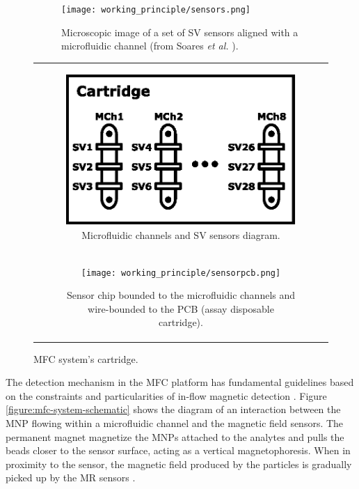 \begin{figure}[!ht]
    \centering
    \begin{subfigure}[c]{.48\textwidth}
        \centering
        \texttt{[image: working\_principle/sensors.png]}
        \caption{Microscopic image of a set of SV sensors aligned with a microfluidic channel (from Soares \textit{et al.} \cite{8692507}).}
        \label{figure:microfluidic-sv-sensors}
    \end{subfigure}\hfill
    \centering
    \begin{tabular}[c]{@{}c@{}}
        \begin{subfigure}[c]{.48\textwidth}
            \centering
            \includegraphics[width=.7\textwidth]{images/chapter_3/working_principle/cartridge.eps}
            \caption{Microfluidic channels and SV sensors diagram.}
            \label{figure:microchannels}
        \end{subfigure}\\
        \noalign{\bigskip}%
        \begin{subfigure}[c]{.48\textwidth}
            \centering
            \texttt{[image: working\_principle/sensorpcb.png]}
            \caption{Sensor chip bounded to the microfluidic channels and wire-bounded to the PCB (assay disposable cartridge).}
            \label{figure:microfluidic-pcb}
        \end{subfigure}
    \end{tabular}

    \caption{MFC system's cartridge.}
    \label{figure:microfluidic-channels}
\end{figure}

The detection mechanism in the \ac{MFC} platform has fundamental guidelines based on the constraints and particularities of in-flow magnetic detection \cite{Soares2019}. Figure \ref{figure:mfc-system-schematic} shows the diagram of an interaction between the \ac{MNP} flowing within a microfluidic channel and the magnetic field sensors. The permanent magnet magnetize the \ac{MNP}s attached to the analytes and pulls the beads closer to the sensor surface, acting as a vertical magnetophoresis. When in proximity to the sensor, the magnetic field produced by the particles is gradually picked up by the \ac{MR} sensors \cite{DiogoC_thesis}. 


